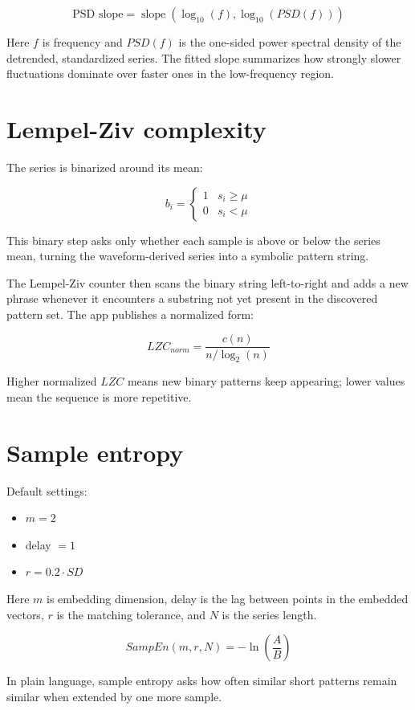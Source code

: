 \documentclass[11pt]{article}
\begin{document}
\[
\text{PSD slope} =
\operatorname{slope}\left(\log_{10}(f), \log_{10}(PSD(f))\right)
\]

Here $f$ is frequency and $PSD(f)$ is the one-sided power spectral density of
the detrended, standardized series. The fitted slope summarizes how strongly
slower fluctuations dominate over faster ones in the low-frequency region.

\section*{Lempel-Ziv complexity}

The series is binarized around its mean:

\[
b_i =
\begin{cases}
1 & s_i \ge \mu \\
0 & s_i < \mu
\end{cases}
\]

This binary step asks only whether each sample is above or below the series
mean, turning the waveform-derived series into a symbolic pattern string.

The Lempel-Ziv counter then scans the binary string left-to-right and adds a new
phrase whenever it encounters a substring not yet present in the discovered
pattern set. The app publishes a normalized form:

\[
LZC_{norm} = \frac{c(n)}{n / \log_2(n)}
\]

Higher normalized $LZC$ means new binary patterns keep appearing; lower values
mean the sequence is more repetitive.

\section*{Sample entropy}

Default settings:

\begin{itemize}[leftmargin=1.5em]
\item $m = 2$
\item delay $= 1$
\item $r = 0.2 \cdot SD$
\end{itemize}

Here $m$ is embedding dimension, delay is the lag between points in the
embedded vectors, $r$ is the matching tolerance, and $N$ is the series length.

\[
SampEn(m, r, N) = -\ln\left(\frac{A}{B}\right)
\]

In plain language, sample entropy asks how often similar short patterns remain
similar when extended by one more sample.
\end{document}
